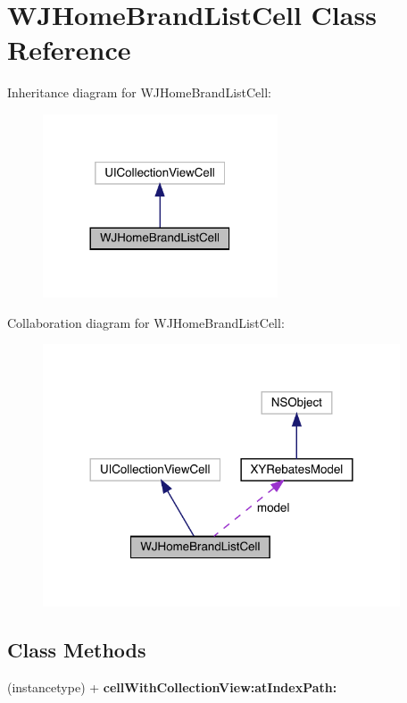 \hypertarget{interface_w_j_home_brand_list_cell}{}\section{W\+J\+Home\+Brand\+List\+Cell Class Reference}
\label{interface_w_j_home_brand_list_cell}


Inheritance diagram for W\+J\+Home\+Brand\+List\+Cell\+:\nopagebreak
\begin{figure}[H]
\begin{center}
\leavevmode
\includegraphics[width=197pt]{interface_w_j_home_brand_list_cell__inherit__graph}
\end{center}
\end{figure}


Collaboration diagram for W\+J\+Home\+Brand\+List\+Cell\+:\nopagebreak
\begin{figure}[H]
\begin{center}
\leavevmode
\includegraphics[width=300pt]{interface_w_j_home_brand_list_cell__coll__graph}
\end{center}
\end{figure}
\subsection*{Class Methods}
\begin{DoxyCompactItemize}
\item 
\mbox{\label{interface_w_j_home_brand_list_cell_a6fbf2a355b871cb7b70c8732c4842418}} 
(instancetype) + {\bfseries cell\+With\+Collection\+View\+:at\+Index\+Path\+:}
\end{DoxyCompactItemize}
